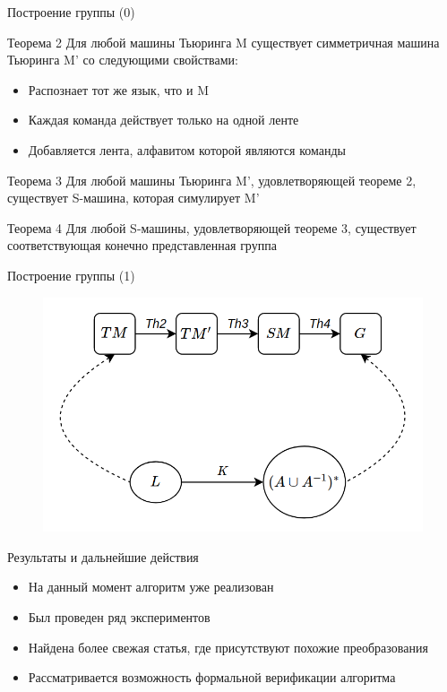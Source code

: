 \documentclass[russian,english,hyperref=unicode]{beamer}
\begin{document}
\begin{frame}{Построение группы (0)}
\begin{block}{Теорема 2}
Для любой машины Тьюринга M существует симметричная машина Тьюринга M' со следующими свойствами:
    \begin{itemize}
        \item Распознает тот же язык, что и M
        \item Каждая команда действует только на одной ленте
        \item Добавляется лента, алфавитом которой являются команды
    \end{itemize}
\end{block}
\pause
\begin{block}{Теорема 3}
Для любой машины Тьюринга M', удовлетворяющей теореме 2, существует S-машина, которая симулирует M'
\end{block}
\pause
\begin{block}{Теорема 4}
Для любой S-машины, удовлетворяющей теореме 3, существует соответствующая конечно представленная группа
\end{block}
\end{frame}

\begin{frame}{Построение группы (1)}
\begin{figure}[H]
  \centering
  \includegraphics[width=120mm]{1.png}
 \end{figure}
\end{frame}

\begin{frame}{Результаты и дальнейшие действия}
    \begin{itemize}
        \item На данный момент алгоритм уже реализован
        \item Был проведен ряд экспериментов
        \item Найдена более свежая статья, где присутствуют похожие преобразования
        \item Рассматривается возможность формальной верификации алгоритма
    \end{itemize}
\end{frame}
\end{document}
